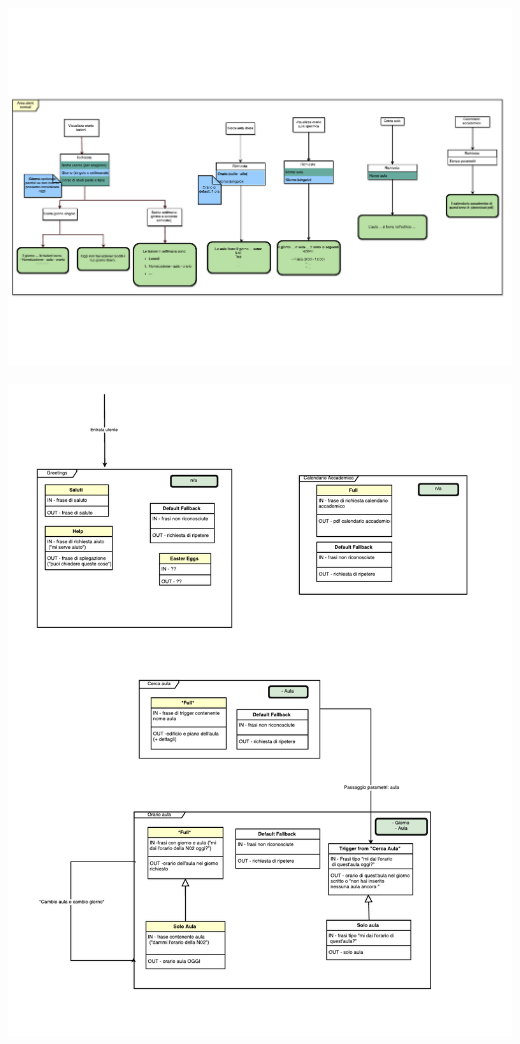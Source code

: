 \documentclass[]{article}
\begin{document}
\vspace*{-3cm}
\hspace*{-2cm} 
\includegraphics[width=2\textwidth, angle =90 ]{p03}
\thispagestyle{empty}

\vspace*{-3cm}
\hspace*{-3cm} 
\includegraphics[width=1.6\textwidth]{p05}
\thispagestyle{empty}
\end{document}
